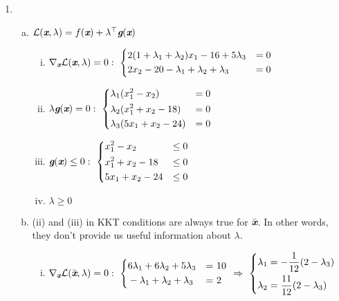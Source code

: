 \begin{enumerate}
	\item \begin{enumerate}[(a)]
		\item $\mathcal{L}(\textit{\textbf{x}}, \textit{\textbf{$\lambda$}}) = f(\textit{\textbf{x}}) +\lambda^\top\textit{\textbf{g}}(\textit{\textbf{x}}) $
		\begin{enumerate}[(i)]
			\item $\nabla_{\textit{\textbf{x}}} \mathcal{L}(\textit{\textbf{x}},\lambda) = 0:~\left\{\begin{aligned}
			&2(1+\lambda_1+\lambda_2)x_1 -16+5 \lambda_3& = 0\\
			&2x_2 -20-\lambda_1+ \lambda_2+\lambda_3&=0
			\end{aligned}\right.$
			
			\item $\lambda\textit{\textbf{g}}(\textit{\textbf{x}}) = 0:~
			\left\{\begin{aligned}
			&\lambda_1(x_1^2-x_2)& = 0\\
			&\lambda_2(x_1^2+x_2-18)&=0\\
			&\lambda_3(5x_1+x_2-24)&=0
			\end{aligned}\right.$ 
			
			\item $\textit{\textbf{g}}(\textit{\textbf{x}})\le 0: ~
			\left\{\begin{aligned}
			&x_1^2-x_2& \le 0\\
			&x_1^2+x_2-18&\le0\\
			&5x_1+x_2-24&\le0
			\end{aligned}\right.$
			
			\item $\lambda\ge 0$
		\end{enumerate}
		
		\item (ii) and (iii) in KKT conditions are always true for $\bar{\textit{\textbf{x}}}$. In other words, they don't provide us useful information about $\lambda$.
		\begin{enumerate}[(i)]
			\item $\nabla_{\textit{\textbf{x}}} \mathcal{L}(\bar{\textit{\textbf{x}}},\lambda) = 0:~\left\{\begin{aligned}
			&6\lambda_1+6\lambda_2 +5 \lambda_3& = &~ 10\\
			&-\lambda_1 + \lambda_2+\lambda_3& = &~ 2
			\end{aligned}\right.~\Rightarrow~\left\{
			\begin{aligned}
			&\lambda_1 = -\frac{1}{12}(2-\lambda_3)\\
			&\lambda_2 =\frac{11}{12}(2-\lambda_3)
			\end{aligned}
			\right.$
			

\end{enumerate}
\end{enumerate}
\end{enumerate}
